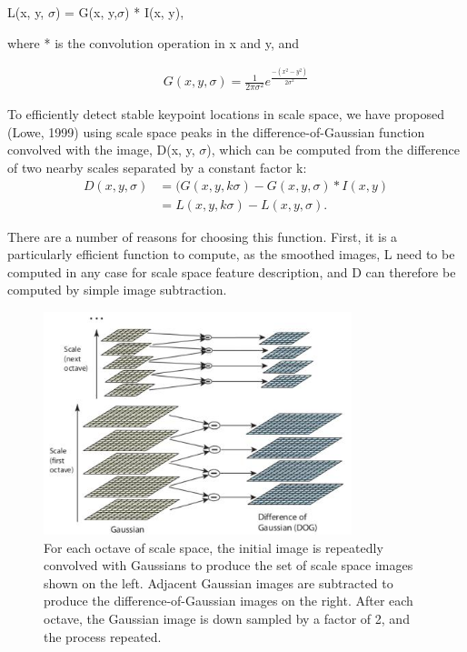 L(x, y, $\sigma$) = G(x, y,$\sigma$) * I(x, y),


where * is the convolution operation in x and y, and

\begin{align*} 
 G(x, y,\sigma )  =\frac{1}{2\pi\sigma^2} e^\frac{-( x^2 -  y^2)}{2\sigma^2}  
\end{align*}

To efficiently detect stable keypoint locations in scale space, we have proposed (Lowe,
1999) using scale space peaks in the difference-of-Gaussian function convolved with the
image, D(x, y, $\sigma$), which can be computed from the difference of two nearby scales separated
by a constant factor k:
\begin{align}
D(x, y, \sigma) &= (G(x, y, k\sigma) - G(x, y,\sigma) * I(x, y)\\
                 &= L(x, y, k\sigma) - L(x, y, \sigma) .
   \end{align}               
                  
There are a number of reasons for choosing this function. First, it is a particularly
efficient function to compute, as the smoothed images, L  need to be computed in any
case for scale space feature description, and D can therefore be computed by simple image
subtraction.

\begin{figure}[H]
\centering
\includegraphics[width=0.8\textwidth]{img/sift_dog.jpg}
\caption{ For each octave of scale space, the initial image is repeatedly convolved with Gaussians to
produce the set of scale space images shown on the left. Adjacent Gaussian images are subtracted
to produce the difference-of-Gaussian images on the right. After each octave, the Gaussian image
is down sampled by a factor of 2, and the process repeated.}
\label{fig:sift1}
\end{figure}

